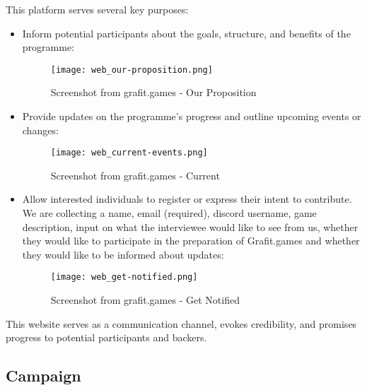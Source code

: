 This platform serves several key purposes:
\begin{itemize}
    \item Inform potential participants about the goals, structure, and benefits of the programme:
    \begin{figure}[H]
        \texttt{[image: web\_our-proposition.png]}
        \caption{Screenshot from grafit.games - Our Proposition}
        \label{fig:web_our-proposition}
    \end{figure}
    \item Provide updates on the programme’s progress and outline upcoming events or changes:
    \begin{figure}[H]
        \texttt{[image: web\_current-events.png]}
        \caption{Screenshot from grafit.games - Current}
        \label{fig:web_current-events}
    \end{figure}
    \item Allow interested individuals to register or express their intent to contribute. We are collecting a name, email (required), discord username, game description, input on what the interviewee would like to see from us, whether they would like to participate in the preparation of Grafit.games and whether they would like to be informed about updates:
    \begin{figure}[H]    
        \texttt{[image: web\_get-notified.png]}
        \caption{Screenshot from grafit.games - Get Notified}
        \label{fig:web_get-notified}
    \end{figure}
\end{itemize}

This website serves as a communication channel, evokes credibility, and promises progress to potential participants and backers.
        
\subsection{Campaign}

